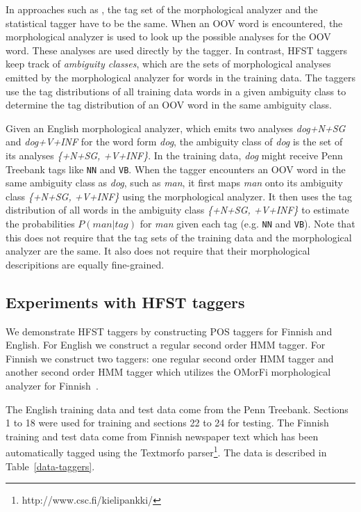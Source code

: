 \documentclass{llncs}
\begin{document}
In approaches such as \cite{Tzoukerman:1996,Oravecz:2002}, the tag set
of the morphological analyzer and the statistical tagger have to be
the same. When an OOV word is encountered, the morphological analyzer
is used to look up the possible analyses for the OOV word. These
analyses are used directly by the tagger. In contrast, HFST taggers
keep track of {\it ambiguity classes}, which are the sets of
morphological analyses emitted by the morphological analyzer for words
in the training data. The taggers use the tag distributions of all
training data words in a given ambiguity class to determine the tag
distribution of an OOV word in the same ambiguity class.

Given an English morphological analyzer, which emits two analyses {\it
  dog\-+N\-+SG} and {\it dog\-+V\-+INF} for the word form {\it dog},
the ambiguity class of {\it dog} is the set of its analyses {\it
  \{+N\-+SG, +V\-+INF\}}. In the training data, {\it dog} might
receive Penn Treebank tags like {\tt NN} and {\tt VB}. When the tagger
encounters an OOV word in the same ambiguity class as {\it dog}, such
as {\it man}, it first maps {\it man} onto its ambiguity class {\it
  \{+N\-+SG, +V\-+INF\}} using the morphological analyzer. It then
uses the tag distribution of all words in the ambiguity class {\it
  \{+N\-+SG, +V\-+INF\}} to estimate the probabilities $P(man|tag)$
for {\it man} given each tag (e.g. {\tt NN} and {\tt VB}). Note that
this does not require that the tag sets of the training data and the
morphological analyzer are the same. It also does not require that
their morphological descripitions are equally fine-grained.


\subsection{Experiments with HFST taggers}

We demonstrate HFST taggers by constructing POS taggers for Finnish
and English. For English we construct a regular second order HMM
tagger. For Finnish we construct two taggers: one regular second
order HMM tagger and another second order HMM tagger which utilizes
the OMorFi morphological analyzer for Finnish~\cite{pirinen/2008}.

The English training data and test data come from the Penn
Treebank. Sections 1 to 18 were used for training and sections 22 to
24 for testing. The Finnish training and test data come from Finnish
newspaper text which has been automatically tagged using the
Textmorfo parser\footnote{http://www.csc.fi/kielipankki/}. The data
is described in Table~\ref{data-taggers}.
\end{document}
